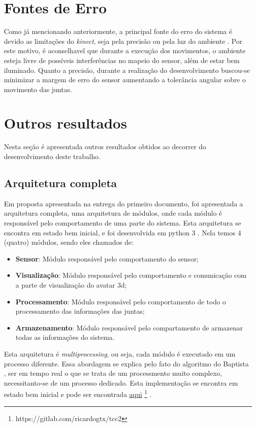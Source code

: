 \section{Fontes de Erro}\label{sol:fontesErro}
  Como já mencionando anteriormente, a principal fonte do erro do sistema é devido as limitações do \textit{kinect}, seja pela precisão ou pela luz do ambiente
. Por este motivo, é aconselhavel que durante a execução dos movimentos, o ambiente esteja livre de possíveis interferências no mapeio do  sensor, além de estar bem iluminado. Quanto a precisão,
durante a realização do desenvolvimento buscou-se minimizar a margem de erro do sensor aumentando a tolerância angular sobre o movimento das juntas.

\section{Outros resultados}\label{sol:outrosResultados}
  Nesta seção é apresentada outros resultados obtidos ao decorrer do desenvolvimento deste trabalho.

\subsection{Arquitetura completa}\label{sol:arquiCompleta}
Em proposta apresentada na entrega do primeiro documento, foi apresentada a arquitetura completa, uma arquitetura de módulos, onde cada módulo é responsável
pelo comportamento de uma parte do sistema. Esta arquitetura se encontra em estado bem inicial, e foi desenvolvida
em python 3 \cite{pythondoc}. Nela temos 4 (quatro) módulos, sendo eles chamados de:

\begin{itemize}
  \item \textbf{Sensor}: Módulo responsável pelo comportamento do sensor;
  \item \textbf{Visualização}: Módulo responsável pelo comportamento e comunicação com a parte de visualização do avatar 3d;
  \item \textbf{Processamento}: Módulo responsável pelo comportamento de todo o processamento das informações das juntas;
  \item \textbf{Armazenamento}: Módulo responsável pelo compartamento de armazenar todas as informações do sistema.
\end{itemize}


Esta arquitetura é \textit{multiprocessing}, ou seja, cada módulo é executado em um processo diferente. Essa abordagem se explica pelo fato do algoritmo do
Baptista \cite{roberto}, ser em tempo real o que se trata de um processmento muito complexo, necessitanto-se de um processo dedicado. Esta implementação se encontra em estado bem inicial e pode ser encontrada \href{https://gitlab.com/ricardogtx/tcc2}{aqui} \footnote{https://gitlab.com/ricardogtx/tcc2} .

